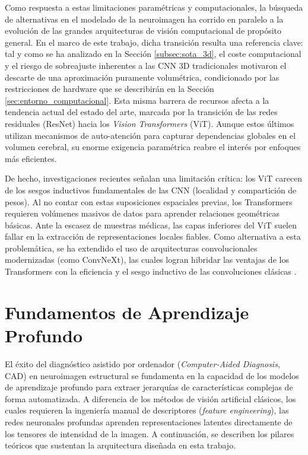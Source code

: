 \documentclass[12pt, oneside, english, spanish]{book}
\begin{document}
Como respuesta a estas limitaciones paramétricas y computacionales, la búsqueda de alternativas en el modelado de la neuroimagen ha corrido en paralelo a la evolución de las grandes arquitecturas de visión computacional de propósito general. En el marco de este trabajo, dicha transición resulta una referencia clave: tal y como se ha analizado en la Sección \ref{subsec:sota_3d}, el coste computacional y el riesgo de sobreajuste inherentes a las CNN 3D tradicionales motivaron el descarte de una aproximación puramente volumétrica, condicionado por las restricciones de hardware que se describirán en la Sección \ref{sec:entorno_computacional}. Esta misma barrera de recursos afecta a la tendencia actual del estado del arte, marcada por la transición de las redes residuales (ResNet) hacia los \textit{Vision Transformers} (ViT). Aunque estos últimos utilizan mecanismos de auto-atención para capturar dependencias globales en el volumen cerebral, su enorme exigencia paramétrica reabre el interés por enfoques más eficientes.

 

De hecho, investigaciones recientes \cite{liu2022convnet} señalan una limitación crítica: los ViT carecen de los sesgos inductivos fundamentales de las CNN (localidad y compartición de pesos). Al no contar con estas suposiciones espaciales previas, los Transformers requieren volúmenes masivos de datos para aprender relaciones geométricas básicas. Ante la escasez de muestras médicas, las capas inferiores del ViT suelen fallar en la extracción de representaciones locales fiables. Como alternativa a esta problemática, se ha extendido el uso de arquitecturas convolucionales modernizadas (como ConvNeXt), las cuales logran hibridar las ventajas de los Transformers con la eficiencia y el sesgo inductivo de las convoluciones clásicas \cite{liu2022convnet}.

\section{Fundamentos de Aprendizaje Profundo} \label{sec:deep_learning_theory}

El éxito del diagnóstico asistido por ordenador (\textit{Computer-Aided Diagnosis}, CAD) en neuroimagen estructural se fundamenta en la capacidad de los modelos de aprendizaje profundo para extraer jerarquías de características complejas de forma automatizada. A diferencia de los métodos de visión artificial clásicos, los cuales requieren la ingeniería manual de descriptores (\textit{feature engineering}), las redes neuronales profundas aprenden representaciones latentes directamente de los tensores de intensidad de la imagen. A continuación, se describen los pilares teóricos que sustentan la arquitectura diseñada en esta trabajo.
\end{document}
